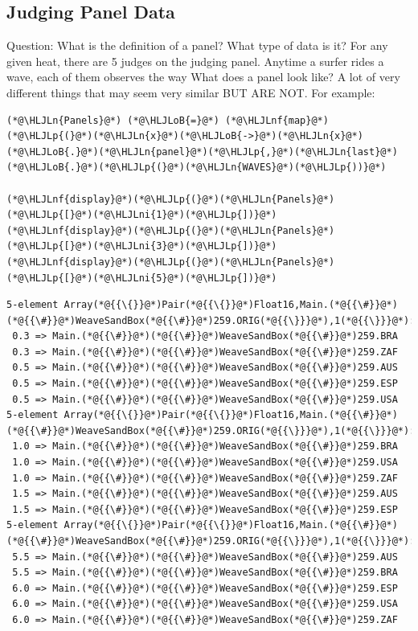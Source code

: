 \documentclass[12pt,a4paper]{article}
\newcommand{\HLJLn}[1]{#1}
\newcommand{\HLJLnf}[1]{\textcolor[RGB]{66,102,213}{#1}}
\newcommand{\HLJLni}[1]{\textcolor[RGB]{59,151,46}{#1}}
\newcommand{\HLJLoB}[1]{\textcolor[RGB]{102,102,102}{\textbf{#1}}}
\newcommand{\HLJLp}[1]{#1}
\begin{document}
\subsection{Judging Panel Data}
Question: What is the definition of a panel? What type of data is it? For any given heat, there are 5 judges on the judging panel. Anytime a surfer rides a wave, each of them observes the way  What does a panel look like? A lot of very different things that may seem very similar BUT ARE NOT. For example:


\begin{lstlisting}
(*@\HLJLn{Panels}@*) (*@\HLJLoB{=}@*) (*@\HLJLnf{map}@*)(*@\HLJLp{(}@*)(*@\HLJLn{x}@*)(*@\HLJLoB{->}@*)(*@\HLJLn{x}@*)(*@\HLJLoB{.}@*)(*@\HLJLn{panel}@*)(*@\HLJLp{,}@*)(*@\HLJLn{last}@*)(*@\HLJLoB{.}@*)(*@\HLJLp{(}@*)(*@\HLJLn{WAVES}@*)(*@\HLJLp{))}@*)

(*@\HLJLnf{display}@*)(*@\HLJLp{(}@*)(*@\HLJLn{Panels}@*)(*@\HLJLp{[}@*)(*@\HLJLni{1}@*)(*@\HLJLp{])}@*)
(*@\HLJLnf{display}@*)(*@\HLJLp{(}@*)(*@\HLJLn{Panels}@*)(*@\HLJLp{[}@*)(*@\HLJLni{3}@*)(*@\HLJLp{])}@*)
(*@\HLJLnf{display}@*)(*@\HLJLp{(}@*)(*@\HLJLn{Panels}@*)(*@\HLJLp{[}@*)(*@\HLJLni{5}@*)(*@\HLJLp{])}@*)
\end{lstlisting}

\begin{lstlisting}
5-element Array(*@{{\{}}@*)Pair(*@{{\{}}@*)Float16,Main.(*@{{\#}}@*)(*@{{\#}}@*)WeaveSandBox(*@{{\#}}@*)259.ORIG(*@{{\}}}@*),1(*@{{\}}}@*):
 0.3 => Main.(*@{{\#}}@*)(*@{{\#}}@*)WeaveSandBox(*@{{\#}}@*)259.BRA
 0.3 => Main.(*@{{\#}}@*)(*@{{\#}}@*)WeaveSandBox(*@{{\#}}@*)259.ZAF
 0.5 => Main.(*@{{\#}}@*)(*@{{\#}}@*)WeaveSandBox(*@{{\#}}@*)259.AUS
 0.5 => Main.(*@{{\#}}@*)(*@{{\#}}@*)WeaveSandBox(*@{{\#}}@*)259.ESP
 0.5 => Main.(*@{{\#}}@*)(*@{{\#}}@*)WeaveSandBox(*@{{\#}}@*)259.USA
5-element Array(*@{{\{}}@*)Pair(*@{{\{}}@*)Float16,Main.(*@{{\#}}@*)(*@{{\#}}@*)WeaveSandBox(*@{{\#}}@*)259.ORIG(*@{{\}}}@*),1(*@{{\}}}@*):
 1.0 => Main.(*@{{\#}}@*)(*@{{\#}}@*)WeaveSandBox(*@{{\#}}@*)259.BRA
 1.0 => Main.(*@{{\#}}@*)(*@{{\#}}@*)WeaveSandBox(*@{{\#}}@*)259.USA
 1.0 => Main.(*@{{\#}}@*)(*@{{\#}}@*)WeaveSandBox(*@{{\#}}@*)259.ZAF
 1.5 => Main.(*@{{\#}}@*)(*@{{\#}}@*)WeaveSandBox(*@{{\#}}@*)259.AUS
 1.5 => Main.(*@{{\#}}@*)(*@{{\#}}@*)WeaveSandBox(*@{{\#}}@*)259.ESP
5-element Array(*@{{\{}}@*)Pair(*@{{\{}}@*)Float16,Main.(*@{{\#}}@*)(*@{{\#}}@*)WeaveSandBox(*@{{\#}}@*)259.ORIG(*@{{\}}}@*),1(*@{{\}}}@*):
 5.5 => Main.(*@{{\#}}@*)(*@{{\#}}@*)WeaveSandBox(*@{{\#}}@*)259.AUS
 5.5 => Main.(*@{{\#}}@*)(*@{{\#}}@*)WeaveSandBox(*@{{\#}}@*)259.BRA
 6.0 => Main.(*@{{\#}}@*)(*@{{\#}}@*)WeaveSandBox(*@{{\#}}@*)259.ESP
 6.0 => Main.(*@{{\#}}@*)(*@{{\#}}@*)WeaveSandBox(*@{{\#}}@*)259.USA
 6.0 => Main.(*@{{\#}}@*)(*@{{\#}}@*)WeaveSandBox(*@{{\#}}@*)259.ZAF
\end{lstlisting}
\end{document}
